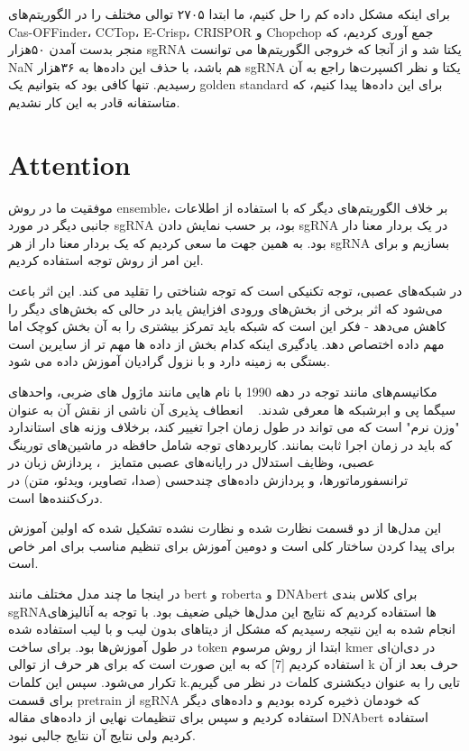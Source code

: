 \documentclass[12pt,a4paper,BCOR=.7cm,headsepline,bibliography=totoc]{report}
\begin{document}
برای اینکه مشکل داده کم را حل کنیم، ما ابتدا ۲۷۰۵ توالی مختلف را در الگوریتم‌های Cas-OFFinder، CCTop، E-Crisp، CRISPOR و Chopchop جمع آوری کردیم، که منجر بدست آمدن ۵۰هزار sgRNA یکتا شد و از آنجا که خروجی الگوریتم‌ها می توانست NaN هم باشد، با حذف این داده‌ها به ۳۶هزار sgRNA یکتا و نظر اکسپرت‌ها راجع به آن رسیدیم. تنها کافی بود که بتوانیم یک golden standard برای این داده‌ها پیدا کنیم، که متاستفانه قادر به این کار نشدیم.

\section{Attention}
موفقیت ما در روش ensemble، بر خلاف الگوریتم‌های دیگر که با استفاده از اطلاعات جانبی دیگر در مورد sgRNA بود، بر حسب نمایش دادن sgRNA در یک بردار معنا دار بود. به همین جهت ما سعی کردیم که یک بردار معنا دار از هر ‌sgRNA بسازیم و برای این امر از روش توجه استفاده کردیم.

در شبکه‌های عصبی، توجه تکنیکی است که توجه شناختی را تقلید می کند. این اثر باعث می‌شود که اثر برخی از بخش‌های ورودی افزایش یابد در حالی که بخش‌های دیگر را کاهش می‌دهد - فکر این است که شبکه باید تمرکز بیشتری را به آن بخش کوچک اما مهم داده اختصاص دهد. یادگیری اینکه کدام بخش از داده ها مهم تر از سایرین است بستگی به زمینه دارد و با نزول گرادیان آموزش داده می شود.

مکانیسم‌های مانند توجه در دهه 1990 با نام هایی مانند ماژول های ضربی، واحدهای سیگما پی و ابرشبکه ها معرفی شدند. ~\cite{Yann} انعطاف پذیری آن ناشی از نقش آن به عنوان "وزن نرم" است که می تواند در طول زمان اجرا تغییر کند، برخلاف وزنه های استاندارد که باید در زمان اجرا ثابت بمانند. کاربردهای توجه شامل حافظه در ماشین‌های تورینگ عصبی، وظایف استدلال در رایانه‌های عصبی متمایز ~\cite{Hybrid}، پردازش زبان در ترانسفورماتورها، و پردازش داده‌های چندحسی (صدا، تصاویر، ویدئو، متن) در درک‌کننده‌ها است.~\cite{nature,Vaswani, Ramachandran, Jaegle, Ray} 	

این مدل‌ها از دو قسمت نظارت شده و  نظارت نشده تشکیل شده که اولین آموزش برای پیدا کردن ساختار کلی است و دومین آموزش برای تنظیم مناسب برای امر خاص است.

در اینجا ما چند مدل مختلف مانند bert و roberta و DNAbert برای کلاس بندی sgRNAها استفاده کردیم که نتایج این مدل‌ها خیلی ضعیف بود. با توجه به آنالیزهای انجام شده به این نتیجه رسیدیم که مشکل از دیتاهای بدون لیب و با لیب استفاده شده در طول آموزش‌ها بود. برای ساخت token ابتدا از روش مرسوم kmer در دی‌ان‌ای استفاده کردیم [7] که به این صورت است که برای هر حرف از توالی k حرف بعد از آن تکرار می‌شود. سپس این کلمات kتایی را به عنوان دیکشنری کلمات در نظر می گیریم. برای قسمت pretrain از sgRNA که خودمان ذخیره کرده بودیم و داده‌های دیگر استفاده کردیم و سپس برای تنظیمات نهایی از داده‌های مقاله DNAbert استفاده کردیم ولی نتایج آن نتایج جالبی نبود.
\end{document}
